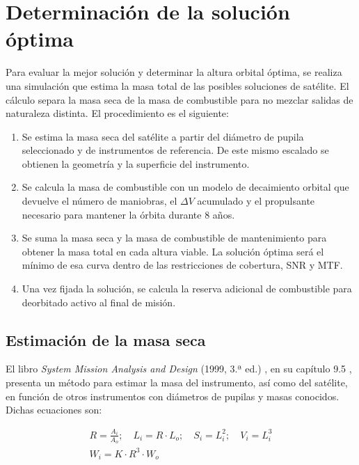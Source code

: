 \chapter{Determinación de la solución óptima}
\minitoc

Para evaluar la mejor solución y determinar la altura orbital óptima, se realiza una simulación que estima la masa total de las posibles soluciones de satélite. El cálculo separa la masa seca de la masa de combustible para no mezclar salidas de naturaleza distinta. El procedimiento es el siguiente:

\begin{enumerate}
    \item Se estima la masa seca del satélite a partir del diámetro de pupila seleccionado y de instrumentos de referencia. De este mismo escalado se obtienen la geometría y la superficie del instrumento.
    \item Se calcula la masa de combustible con un modelo de decaimiento orbital que devuelve el número de maniobras, el \(\Delta V\) acumulado y el propulsante necesario para mantener la órbita durante 8 años.
    \item Se suma la masa seca y la masa de combustible de mantenimiento para obtener la masa total en cada altura viable. La solución óptima será el mínimo de esa curva dentro de las restricciones de cobertura, SNR y MTF.
    \item Una vez fijada la solución, se calcula la reserva adicional de combustible para deorbitado activo al final de misión.
\end{enumerate}

\newpage
\section{Estimación de la masa seca}

El libro \textit{System Mission Analysis and Design} (1999, 3.ª ed.) \cite{wertz1999smad}, en su capítulo 9.5 , presenta un método para estimar la masa del instrumento, así como del satélite, en función de otros instrumentos con diámetros de pupilas y masas conocidos. Dichas ecuaciones son:

\begin{equation}
\begin{gathered}
R = \frac{A_i}{A_o}; \quad L_i = R \cdot L_o; \quad S_i = L_i^2; \quad V_i = L_i^3 \\
W_i = K \cdot R^3 \cdot W_o
\end{gathered}
\end{equation}

